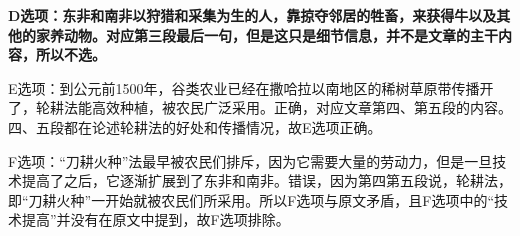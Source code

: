 \begin{blk}
\begin{nlz}
        \textbf{D选项：东非和南非以狩猎和采集为生的人，靠掠夺邻居的牲畜，来获得牛以及其他的家养动物。对应第三段最后一句，但是这只是细节信息，并不是文章的主干内容，所以不选。}

        E选项：到公元前1500年，谷类农业已经在撒哈拉以南地区的稀树草原带传播开了，轮耕法能高效种植，被农民广泛采用。正确，对应文章第四、第五段的内容。四、五段都在论述轮耕法的好处和传播情况，故E选项正确。

        F选项：“刀耕火种”法最早被农民们排斥，因为它需要大量的劳动力，但是一旦技术提高了之后，它逐渐扩展到了东非和南非。错误，因为第四第五段说，轮耕法，即“刀耕火种”一开始就被农民们所采用。所以F选项与原文矛盾，且F选项中的“技术提高”并没有在原文中提到，故F选项排除。
    \end{nlz}
\end{blk}
